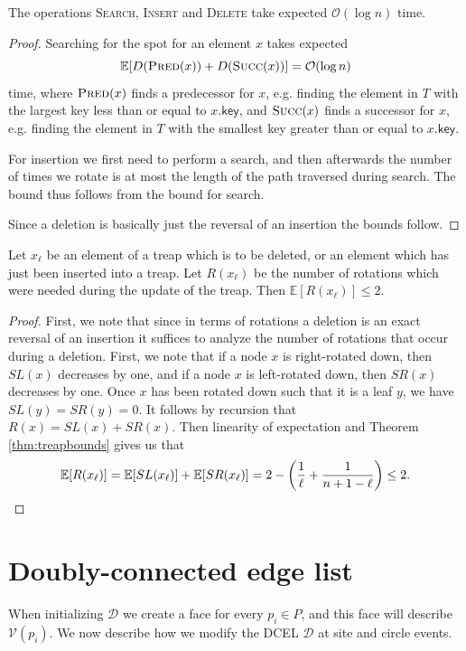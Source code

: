 \begin{lem} \label{lem:treapoperationsbounds}
The operations \textsc{Search}, \textsc{Insert} and \textsc{Delete} take expected $\mathcal{O}(\log n)$ time.
\end{lem}
\begin{proof}
Searching for the spot for an element $x$ takes expected
\[
    \mathbb{E}[D(\textsc{Pred}(x)) + D(\textsc{Succ}(x))] = \mathcal{O}(\log n)
\]
time, where $\textsc{Pred}(x)$ finds a predecessor for $x$, e.g. finding the element in $T$ with the largest key less than or equal to $x\textsf{.key}$, and $\textsc{Succ}(x)$ finds a successor for $x$, e.g. finding the element in $T$ with the smallest key greater than or equal to $x\textsf{.key}$.

For insertion we first need to perform a search, and then afterwards the number of times we rotate is at most the length of the path traversed during search. The bound thus follows from the bound for search.

Since a deletion is basically just the reversal of an insertion the bounds follow.
\end{proof}

\begin{lem} \label{lem:treaprotationbound}
Let $x_{\ell}$ be an element of a treap which is to be deleted, or an element which has just been inserted into a treap. Let $R(x_{\ell})$ be the number of rotations which were needed during the update of the treap. Then $\mathbb{E}[R(x_{\ell})] \leq 2$.
\end{lem}
\begin{proof}
First, we note that since in terms of rotations a deletion is an exact reversal of an insertion it suffices to analyze the number of rotations that occur during a deletion. First, we note that if a node $x$ is right-rotated down, then $SL(x)$ decreases by one, and if a node $x$ is left-rotated down, then $SR(x)$ decreases by one. Once $x$ has been rotated down such that it is a leaf $y$, we have $SL(y) = SR(y) = 0$. It follows by recursion that $R(x) = SL(x) + SR(x)$. Then linearity of expectation and Theorem \ref{thm:treapbounds} gives us that
\[
    \mathbb{E}[R(x_{\ell})] = \mathbb{E}[SL(x_{\ell})] + \mathbb{E}[SR(x_{\ell})] = 2 - \left(\frac{1}{\ell} + \frac{1}{n + 1 - \ell}\right) \leq 2.
\]
\end{proof}

\newpage
\section{Doubly-connected edge list}
When initializing $\mathcal{D}$ we create a face for every $p_i \in P$, and this face will describe $\mathcal{V}(p_i)$. We now describe how we modify the DCEL $\mathcal{D}$ at site and circle events.

